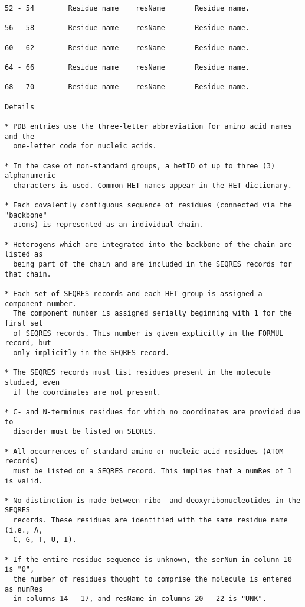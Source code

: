 \begin{lstlisting}
52 - 54        Residue name    resName       Residue name.                        

56 - 58        Residue name    resName       Residue name.                        

60 - 62        Residue name    resName       Residue name.                        

64 - 66        Residue name    resName       Residue name.                        

68 - 70        Residue name    resName       Residue name.                        

Details 

* PDB entries use the three-letter abbreviation for amino acid names and the
  one-letter code for nucleic acids. 

* In the case of non-standard groups, a hetID of up to three (3) alphanumeric
  characters is used. Common HET names appear in the HET dictionary. 

* Each covalently contiguous sequence of residues (connected via the "backbone"
  atoms) is represented as an individual chain. 

* Heterogens which are integrated into the backbone of the chain are listed as
  being part of the chain and are included in the SEQRES records for that chain. 

* Each set of SEQRES records and each HET group is assigned a component number.
  The component number is assigned serially beginning with 1 for the first set
  of SEQRES records. This number is given explicitly in the FORMUL record, but
  only implicitly in the SEQRES record. 

* The SEQRES records must list residues present in the molecule studied, even
  if the coordinates are not present. 

* C- and N-terminus residues for which no coordinates are provided due to
  disorder must be listed on SEQRES. 

* All occurrences of standard amino or nucleic acid residues (ATOM records)
  must be listed on a SEQRES record. This implies that a numRes of 1 is valid. 

* No distinction is made between ribo- and deoxyribonucleotides in the SEQRES
  records. These residues are identified with the same residue name (i.e., A,
  C, G, T, U, I). 

* If the entire residue sequence is unknown, the serNum in column 10 is "0",
  the number of residues thought to comprise the molecule is entered as numRes
  in columns 14 - 17, and resName in columns 20 - 22 is "UNK". 


\end{lstlisting}
